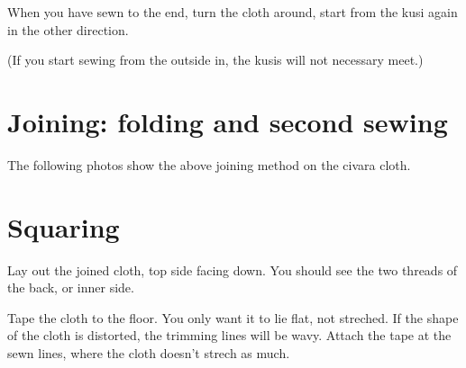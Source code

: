 When you have sewn to the end, turn the cloth around, start from the
kusi again in the other direction.

(If you start sewing from the outside in, the kusis will not necessary
meet.)

\clearpage

\section{Joining: folding and second sewing}

The following photos show the above joining method on the civara cloth.


\setlength{\nextPhotoWidth}{0.5\textwidth}












\clearpage

\section{Squaring}

Lay out the joined cloth, top side facing down. You should see the two
threads of the back, or inner side.

Tape the cloth to the floor. You only want it to lie flat, not streched.
If the shape of the cloth is distorted, the trimming lines will be wavy.
Attach the tape at the sewn lines, where the cloth doesn't strech as
much.

